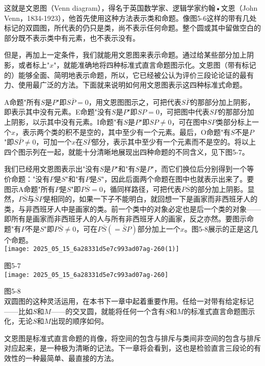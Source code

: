 这就是文恩图（Venn diagram），得名于英国数学家、逻辑学家约翰•文恩（John Venn，1834-1923），他首先使用这种方法表示类和命题。像图5-6这样的带有几处标记的双圆图，所代表的仍只是类，尚不表示任何命题。整个圆或其中留做空白的部分既不表示类中有元素，也不表示没有。

但是，再加上一定条件，我们就能用文恩图来表示命题。通过给某些部分加上阴影，或者标上"$x$"，就能准确地将四种标准式直言命题图示化。文恩图（带有标记的）能够全面、简明地表示命题，所以，它已经被公认为评价三段论论证的最有力、使用最广泛的方法。下面就来说明如何用文恩图表示这四种标准式命题。

A命题"所有$S$是$P$"即$S\bar{P}=0$，用文恩图图示之，可把代表$S\bar{P}$的那部分加上阴影，即表示其中没有元素。E命题"没有$S$是$P$"即$SP=0$，可把图中代表$SP$的那部分加上阴影，以示其中没有元素。I命题"有$S$是$P$"即$SP \neq 0$，可在图中$SP$类部分标上一个$x$，表示两个类的积不是空的，其中至少有一个元素。最后，O命题"有$S$不是$P$"即$S\bar{P} \neq 0$，可加一个$x$在$S\bar{P}$部分，表示其中至少有一个元素而不是空的。将以上四个图示列在一起，就能十分清晰地展现出四种命题的不同含义，见下图5-7。

我们已经用文恩图表示出"没有$S$是$P$"和"有$S$是$P$"，而它们换位后分别得到一个等价命题："没有$P$是$S$"和"有$P$是$S$"，因此后面两个命题在图中也就表示出来了。要图示A命题"所有$P$是$S$"即$P\bar{S}=0$，循同样路径，可把代表$P\bar{S}$的部分加上阴影。显然，$P\bar{S}$与$\bar{S}P$是相同的，如果一下子不能明白，就回想一下是画家而非西班牙人的类，与非西班牙人中是画家的类。前一个类中的对象必定也是后一个类的对象——即所有是画家而非西班牙人的人与所有非西班牙人的画家，反之亦然。要图示命题"有$P$不是$S$"即$P\bar{S} \neq 0$，可在$P\bar{S}(=\bar{S}P)$部分加上一个$x$。图5-8展示的正是这几个命题。\\
\texttt{[image: 2025\_05\_15\_6a28331d5e7c993ad07ag-260(1)]}

图5-7\\
\texttt{[image: 2025\_05\_15\_6a28331d5e7c993ad07ag-260]}

图5-8\\
双圆图的这种灵活运用，在本书下一章中起着重要作用。任给一对带有给定标记——比如$S$和$M$——的交叉圆，就能将任何一个含有$S$和$M$的标准式直言命题图示化，无论$S$和$M$出现的顺序如何。

文恩图是标准式直言命题的肖像，将空间的包含与排斥与类间非空间的包含与排斥对应起来，是一种极为清晰的记法。下一章将会看到，这也是检验直言三段论的有效性的一种最简单、最直接的方法。 